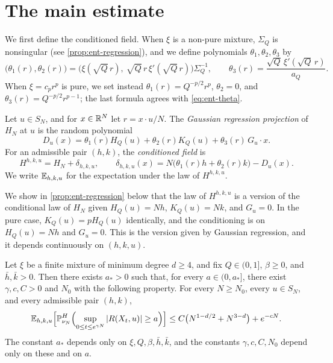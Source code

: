 \section{The main estimate}\label{sec:ent-statement}

We first define the conditioned field. When $\xi$ is a non-pure mixture,
$\Sigma_Q$ is nonsingular (see \cref{prop:ent-regression}), and we define
polynomials $\theta_1,\theta_2,\theta_3$ by
\begin{equation}\label{eq:ent-theta}
 \bigl(\theta_1(r),\theta_2(r)\bigr)
 =\bigl(\xi(\sqrt Q\,r),\ \sqrt Q\,r\,\xi'(\sqrt Q\,r)\bigr)\Sigma_Q^{-1},
 \qquad
 \theta_3(r)=\frac{\sqrt Q\,\xi'(\sqrt Q\,r)}{a_Q}.
\end{equation}
When $\xi=c_pr^p$ is pure, we set instead
$\theta_1(r)=Q^{-p/2}r^p$, $\theta_2=0$, and
$\theta_3(r)=Q^{-p/2}r^{p-1}$; the last formula agrees with
\eqref{eq:ent-theta}.

\begin{definition}\label{def:ent-conditioned}
Let $u\in S_N$, and for $x\in\mathbb R^N$ let $r=x\cdot u/N$. The \emph{Gaussian
regression projection} of $H_N$ at $u$ is the random polynomial
\begin{equation}\label{eq:ent-deleted}
 D_u(x)=\theta_1(r)H_Q(u)+\theta_2(r)K_Q(u)+\theta_3(r)\,G_u\cdot x .
\end{equation}
For an admissible pair $(h,k)$, the \emph{conditioned field} is
\begin{equation}\label{eq:ent-conditioned}
 H^{h,k,u}=H_N+\delta_{h,k,u},\qquad
 \delta_{h,k,u}(x)=N\bigl(\theta_1(r)h+\theta_2(r)k\bigr)-D_u(x).
\end{equation}
We write $\mathbb E_{h,k,u}$ for the expectation under the law of $H^{h,k,u}$.
\end{definition}

We show in \cref{prop:ent-regression} below that the law of $H^{h,k,u}$ is
a version of the conditional law of $H_N$ given $H_Q(u)=Nh$, $K_Q(u)=Nk$,
and $G_u=0$. In the pure case, $K_Q(u)=pH_Q(u)$ identically, and the
conditioning is on $H_Q(u)=Nh$ and $G_u=0$. This is the version given by
Gaussian regression, and it depends continuously on $(h,k,u)$.

\begin{theorem}
\label{thm:ent-main}
Let $\xi$ be a finite mixture of minimum degree $d\ge4$, and fix
$Q\in(0,1]$, $\beta\ge0$, and $\bar h,\bar k>0$. Then there exists $a_*>0$
such that, for every $a\in(0,a_*]$, there exist $\gamma,c,C>0$ and $N_0$
with the following property. For every $N\ge N_0$, every $u\in S_N$, and
every admissible pair $(h,k)$,
\begin{equation}\label{eq:ent-main}
 \mathbb E_{h,k,u}\Bigl[\mathbb P^{H}_{\nu_N}\Bigl(\sup_{0\le t\le e^{\gamma N}}
   |R(X_t,u)|\ge a\Bigr)\Bigr]
 \le C\bigl(N^{1-d/2}+N^{3-d}\bigr)+e^{-cN}.
\end{equation}
The constant $a_*$ depends only on $\xi,Q,\beta,\bar h,\bar k$, and the
constants $\gamma,c,C,N_0$ depend only on these and on $a$.
\end{theorem}

